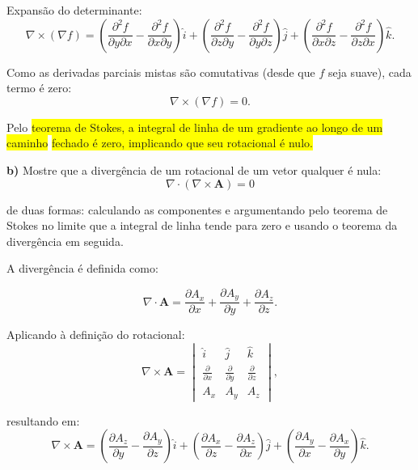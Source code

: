 \documentclass[a4paper,12pt]{article}
\begin{document}
Expansão do determinante:
\begin{equation}
    \nabla \times (\nabla f) = 
    \left( \frac{\partial^2 f}{\partial y \partial x} - \frac{\partial^2 f}{\partial x \partial y} \right) \hat{i} + 
    \left( \frac{\partial^2 f}{\partial z \partial y} - \frac{\partial^2 f}{\partial y \partial z} \right) \hat{j} + 
    \left( \frac{\partial^2 f}{\partial x \partial z} - \frac{\partial^2 f}{\partial z \partial x} \right) \hat{k}.
\end{equation}

Como as derivadas parciais mistas são comutativas (desde que $f$ seja suave), cada termo é zero:
\begin{equation}
    \nabla \times (\nabla f) = 0.
\end{equation}

Pelo \colorbox{yellow}{teorema de Stokes, a integral de linha de um gradiente ao longo de um caminho} 
\colorbox{yellow}{fechado é zero, implicando que seu rotacional é nulo.}

\textbf{b)} Mostre que a divergência de um rotacional de um vetor qualquer é nula:
\begin{equation}
    \nabla \cdot (\nabla \times \mathbf{A}) = 0
\end{equation}

de duas formas: calculando as componentes e argumentando pelo teorema de Stokes no limite que a integral de linha tende para zero e usando o teorema da divergência em seguida.

A divergência é definida como:

\begin{equation}
    \nabla \cdot \mathbf{A} = \frac{\partial A_x}{\partial x} + \frac{\partial A_y}{\partial y} + \frac{\partial A_z}{\partial z}.
\end{equation}

Aplicando à definição do rotacional:
\begin{equation}
    \nabla \times \mathbf{A} = 
    \begin{vmatrix} 
        \hat{i} & \hat{j} & \hat{k} \\
        \frac{\partial}{\partial x} & \frac{\partial}{\partial y} & \frac{\partial}{\partial z} \\
        A_x & A_y & A_z 
    \end{vmatrix},
\end{equation}

resultando em:
\begin{equation}
    \nabla \times \mathbf{A} = 
    \left( \frac{\partial A_z}{\partial y} - \frac{\partial A_y}{\partial z} \right) \hat{i} + 
    \left( \frac{\partial A_x}{\partial z} - \frac{\partial A_z}{\partial x} \right) \hat{j} + 
    \left( \frac{\partial A_y}{\partial x} - \frac{\partial A_x}{\partial y} \right) \hat{k}.
\end{equation}
\end{document}
